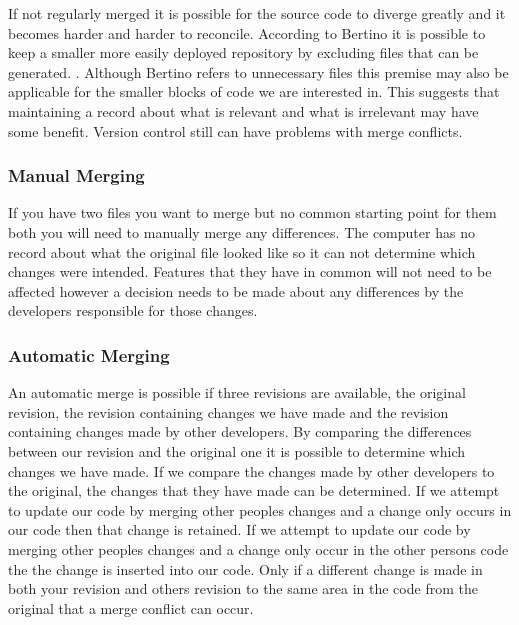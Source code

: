 If not regularly merged it is possible for the source code to diverge greatly and it becomes harder and harder to reconcile.
 According to Bertino it is possible to keep a smaller more easily deployed repository by excluding files that can be generated. \cite{Bertino2012}. Although Bertino refers to unnecessary files this premise may also be applicable for the smaller blocks of code we are interested in. This suggests that maintaining a record about what is relevant and what is irrelevant may have some benefit. Version control still can have problems with merge conflicts. 
 
 
\subsubsection{Manual Merging}
If you have two files you want to merge but no common starting point for them both you will need to manually merge any differences.  The computer has no record about what the original file looked like so it can not determine which changes were intended.  Features that they have in common will not need to be affected however a decision needs to be made about any differences by the developers responsible for those changes.


\subsubsection{Automatic Merging}
An automatic merge is possible if three revisions are available, the original revision, the revision containing changes we have made and the revision containing changes made by other developers. By comparing the differences between our revision and the original one it is possible to determine which changes we have made.  If we compare the changes made by other developers to the original, the changes that they have made can be determined.  If we attempt to update our code by merging other peoples changes and a change only occurs in our code then that change is retained.  If we attempt to update our code by merging other peoples changes and a change only occur in the other persons code the the change is inserted into our code. Only if a different change is made in both your revision and others revision to the same area in the code from the original that a merge conflict can occur. 


